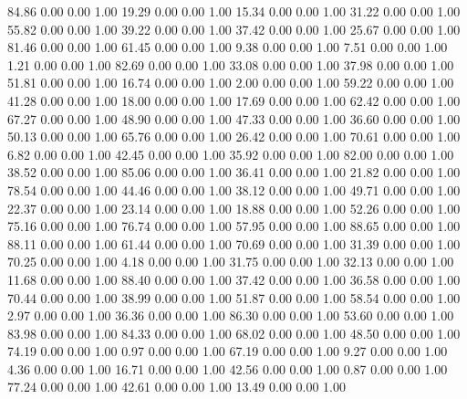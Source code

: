    84.86   0.00   0.00   1.00
   19.29   0.00   0.00   1.00
   15.34   0.00   0.00   1.00
   31.22   0.00   0.00   1.00
   55.82   0.00   0.00   1.00
   39.22   0.00   0.00   1.00
   37.42   0.00   0.00   1.00
   25.67   0.00   0.00   1.00
   81.46   0.00   0.00   1.00
   61.45   0.00   0.00   1.00
    9.38   0.00   0.00   1.00
    7.51   0.00   0.00   1.00
    1.21   0.00   0.00   1.00
   82.69   0.00   0.00   1.00
   33.08   0.00   0.00   1.00
   37.98   0.00   0.00   1.00
   51.81   0.00   0.00   1.00
   16.74   0.00   0.00   1.00
    2.00   0.00   0.00   1.00
   59.22   0.00   0.00   1.00
   41.28   0.00   0.00   1.00
   18.00   0.00   0.00   1.00
   17.69   0.00   0.00   1.00
   62.42   0.00   0.00   1.00
   67.27   0.00   0.00   1.00
   48.90   0.00   0.00   1.00
   47.33   0.00   0.00   1.00
   36.60   0.00   0.00   1.00
   50.13   0.00   0.00   1.00
   65.76   0.00   0.00   1.00
   26.42   0.00   0.00   1.00
   70.61   0.00   0.00   1.00
    6.82   0.00   0.00   1.00
   42.45   0.00   0.00   1.00
   35.92   0.00   0.00   1.00
   82.00   0.00   0.00   1.00
   38.52   0.00   0.00   1.00
   85.06   0.00   0.00   1.00
   36.41   0.00   0.00   1.00
   21.82   0.00   0.00   1.00
   78.54   0.00   0.00   1.00
   44.46   0.00   0.00   1.00
   38.12   0.00   0.00   1.00
   49.71   0.00   0.00   1.00
   22.37   0.00   0.00   1.00
   23.14   0.00   0.00   1.00
   18.88   0.00   0.00   1.00
   52.26   0.00   0.00   1.00
   75.16   0.00   0.00   1.00
   76.74   0.00   0.00   1.00
   57.95   0.00   0.00   1.00
   88.65   0.00   0.00   1.00
   88.11   0.00   0.00   1.00
   61.44   0.00   0.00   1.00
   70.69   0.00   0.00   1.00
   31.39   0.00   0.00   1.00
   70.25   0.00   0.00   1.00
    4.18   0.00   0.00   1.00
   31.75   0.00   0.00   1.00
   32.13   0.00   0.00   1.00
   11.68   0.00   0.00   1.00
   88.40   0.00   0.00   1.00
   37.42   0.00   0.00   1.00
   36.58   0.00   0.00   1.00
   70.44   0.00   0.00   1.00
   38.99   0.00   0.00   1.00
   51.87   0.00   0.00   1.00
   58.54   0.00   0.00   1.00
    2.97   0.00   0.00   1.00
   36.36   0.00   0.00   1.00
   86.30   0.00   0.00   1.00
   53.60   0.00   0.00   1.00
   83.98   0.00   0.00   1.00
   84.33   0.00   0.00   1.00
   68.02   0.00   0.00   1.00
   48.50   0.00   0.00   1.00
   74.19   0.00   0.00   1.00
    0.97   0.00   0.00   1.00
   67.19   0.00   0.00   1.00
    9.27   0.00   0.00   1.00
    4.36   0.00   0.00   1.00
   16.71   0.00   0.00   1.00
   42.56   0.00   0.00   1.00
    0.87   0.00   0.00   1.00
   77.24   0.00   0.00   1.00
   42.61   0.00   0.00   1.00
   13.49   0.00   0.00   1.00
